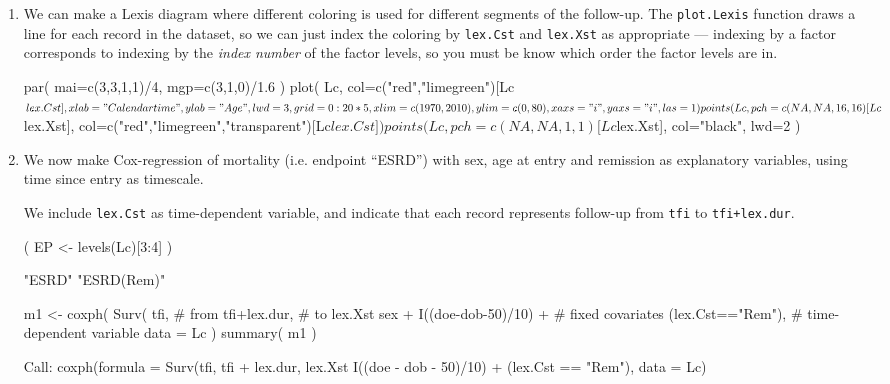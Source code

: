 \begin{enumerate}
\item We can make a Lexis diagram where different coloring is
  used for different segments of the follow-up. The
  \texttt{plot.Lexis} function draws a line for each record in the
  dataset, so we can just index the coloring by \texttt{lex.Cst} and
  \texttt{lex.Xst} as appropriate --- indexing by a factor corresponds
  to indexing by the \emph{index number} of the factor levels, so you
  must be know which order the factor levels are in.
\begin{Schunk}
\begin{Sinput}
 par( mai=c(3,3,1,1)/4, mgp=c(3,1,0)/1.6 )
 plot( Lc, col=c("red","limegreen")[Lc$lex.Cst],
       xlab="Calendar time", ylab="Age",
       lwd=3, grid=0:20*5, xlim=c(1970,2010), ylim=c(0,80), xaxs="i", yaxs="i", las=1 )
 points( Lc, pch=c(NA,NA,16,16)[Lc$lex.Xst],
             col=c("red","limegreen","transparent")[Lc$lex.Cst])
 points( Lc, pch=c(NA,NA,1,1)[Lc$lex.Xst],
             col="black", lwd=2 )
\end{Sinput}
\end{Schunk}


\item We now make Cox-regression of mortality (i.e. endpoint
       ``ESRD'') with sex, age at entry and remission as explanatory
       variables, using time since entry as timescale.
  
  We include \texttt{lex.Cst} as time-dependent variable, and
  indicate that each record represents follow-up from \texttt{tfi}
  to \texttt{tfi+lex.dur}.
\begin{Schunk}
\begin{Sinput}
 ( EP <- levels(Lc)[3:4] )
\end{Sinput}
\begin{Soutput}
[1] "ESRD"      "ESRD(Rem)"
\end{Soutput}
\begin{Sinput}
 m1 <- coxph( Surv( tfi,                  # from
                    tfi+lex.dur,          # to
                    lex.Xst %in% EP ) ~   # event
              sex + I((doe-dob-50)/10) +  # fixed covariates
              (lex.Cst=="Rem"),           # time-dependent variable 
              data = Lc )
 summary( m1 )
\end{Sinput}
\begin{Soutput}
Call:
coxph(formula = Surv(tfi, tfi + lex.dur, lex.Xst %in% EP) ~ sex + 
    I((doe - dob - 50)/10) + (lex.Cst == "Rem"), data = Lc)


\end{Soutput}
\end{Schunk}
\end{enumerate}
